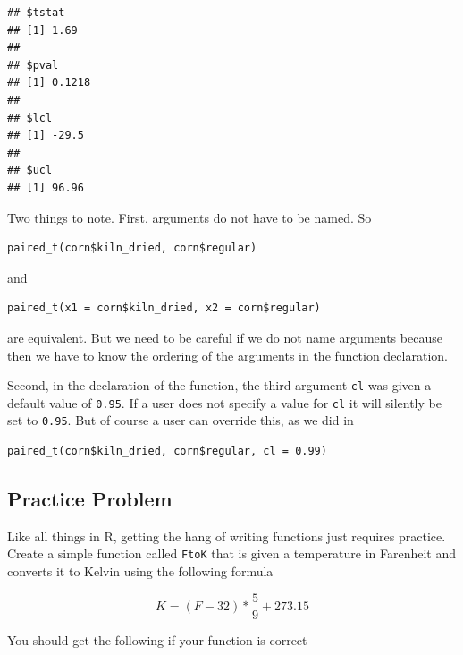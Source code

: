 \documentclass[
]{krantz}
\newenvironment{Shaded}{\begin{snugshade}}{\end{snugshade}}
\newcommand{\DataTypeTok}[1]{\textcolor[rgb]{0.13,0.29,0.53}{#1}}
\newcommand{\FloatTok}[1]{\textcolor[rgb]{0.00,0.00,0.81}{#1}}
\newcommand{\KeywordTok}[1]{\textcolor[rgb]{0.13,0.29,0.53}{\textbf{#1}}}
\newcommand{\NormalTok}[1]{#1}
\newcommand{\OperatorTok}[1]{\textcolor[rgb]{0.81,0.36,0.00}{\textbf{#1}}}
\begin{document}
\begin{Shaded}
\end{Shaded}

\begin{verbatim}
## $tstat
## [1] 1.69
## 
## $pval
## [1] 0.1218
## 
## $lcl
## [1] -29.5
## 
## $ucl
## [1] 96.96
\end{verbatim}

Two things to note. First, arguments do not have to be named. So

\begin{verbatim}
paired_t(corn$kiln_dried, corn$regular)
\end{verbatim}

and

\begin{verbatim}
paired_t(x1 = corn$kiln_dried, x2 = corn$regular)
\end{verbatim}

are equivalent. But we need to be careful if we do not name arguments because then we have to know the ordering of the arguments in the function declaration.

Second, in the declaration of the function, the third argument \texttt{cl} was given a default value of \texttt{0.95}. If a user does not specify a value for \texttt{cl} it will silently be set to \texttt{0.95}. But of course a user can override this, as we did in

\begin{verbatim}
paired_t(corn$kiln_dried, corn$regular, cl = 0.99)
\end{verbatim}

\hypertarget{ch7PP1}{%
\subsection{Practice Problem}\label{ch7PP1}}

Like all things in R, getting the hang of writing functions just requires practice. Create a simple function called \texttt{FtoK} that is given a temperature in Farenheit and converts it to Kelvin using the following formula

\[
K = (F - 32) * \frac{5}{9} + 273.15
\]

You should get the following if your function is correct
\end{document}
